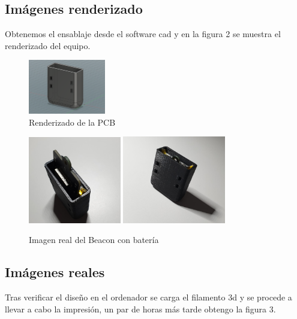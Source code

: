 \documentclass[paper=a4, fontsize=11pt,twoside]{scrartcl}
\begin{document}
    \subsection{Imágenes renderizado}
        Obtenemos el ensablaje desde el software cad y en la figura 2 se muestra el renderizado del equipo.
        \begin{center}
            \begin{figure}[h]
                \centering
                \includegraphics[width=0.3\textwidth]{../mechanical_beacon.PNG}
                \caption{Renderizado de la PCB}
                \label{fig:mesh1}
            \end{figure}
        \end{center}
        \begin{center}
            \begin{figure}[h!]
                \centering
                \includegraphics[width=0.36\textwidth]{../3d_beacon_1.jpeg}
                \includegraphics[width=0.4\textwidth]{../3d_beacon_2.jpeg}
                \caption{Imagen real del Beacon con batería}
                \label{fig:mesh1}
            \end{figure}
        \end{center}
    \subsection{Imágenes reales}
        Tras verificar el diseño en el ordenador se carga el filamento 3d y se procede a llevar a cabo la impresión, un par de horas más tarde
        obtengo la figura 3.
\end{document}
